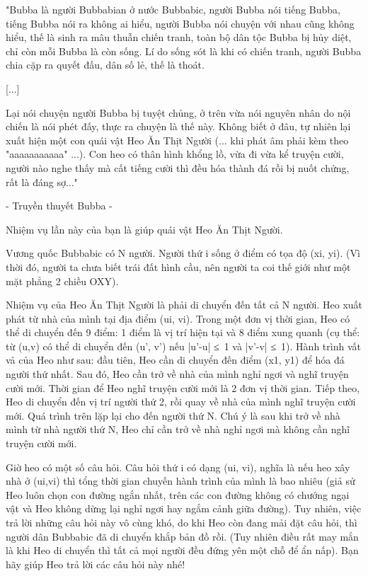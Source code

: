 



"Bubba là người Bubbabian ở nước Bubbabic, người Bubba nói tiếng Bubba, tiếng Bubba nói ra không ai hiểu, người Bubba nói chuyện với nhau cũng không hiểu, thế là sinh ra mâu thuẫn chiến tranh, toàn bộ dân tộc Bubba bị hủy diệt, chỉ còn mỗi Bubba là còn sống. Lí do sống sót là khi có chiến tranh, người Bubba chia cặp ra quyết đấu, dân số lẻ, thế là thoát.

[...]

    Lại nói chuyện người Bubba bị tuyệt chủng, ở trên vừa nói nguyên nhân do nội chiến là nói phét đấy, thực ra chuyện là thế này. Không biết ở đâu, tự nhiên lại xuất hiện một con quái vật Heo Ăn Thịt Người (... khi phát âm phải kèm theo "aaaaaaaaaaa" ...). Con heo có thân hình khổng lồ, vừa đi vừa kể truyện cười, người nào nghe thấy mà cất tiếng cười thì đều hóa thành đá rồi bị nuốt chửng, rất là đáng sợ..."   

- Truyền thuyết Bubba -

   Nhiệm vụ lần này của bạn là giúp quái vật Heo Ăn Thịt Người.  

   Vương quốc Bubbabic có N người. Người thứ i sống ở điểm có tọa độ (xi, yi). (Vì thời đó, người ta chưa biết trái đất hình cầu, nên người ta coi thế giới như một mặt phẳng 2 chiều OXY).  

   Nhiệm vụ của Heo Ăn Thịt Người là phải di chuyển đến tất cả N người. Heo xuất phát từ nhà của mình tại địa điểm (ui, vi). Trong một đơn vị thời gian, Heo có thể di chuyển đến 9 điểm: 1 điểm là vị trí hiện tại và 8 điểm xung quanh (cụ thể: từ (u,v) có thể di chuyển đến (u', v') nếu |u'-u| ≤ 1 và |v'-v| ≤ 1). Hành trình vất vả của Heo như sau: đầu tiên, Heo cần di chuyển đến điểm (x1, y1) để hóa đá người thứ nhất. Sau đó, Heo cần trở về nhà của mình nghỉ ngơi và nghĩ truyện cười mới. Thời gian để Heo nghĩ truyện cười mới là 2 đơn vị thời gian. Tiếp theo, Heo di chuyển đến vị trí người thứ 2, rồi quay về nhà của mình nghĩ truyện cười mới. Quá trình trên lặp lại cho đến người thứ N. Chú ý là sau khi trở về nhà mình từ nhà người thứ N, Heo chỉ cần trở về nhà nghỉ ngơi mà không cần nghĩ truyện cười mới.  

   Giờ heo có một số câu hỏi. Câu hỏi thứ i có dạng (ui, vi), nghĩa là nếu heo xây nhà ở (ui,vi) thì tổng thời gian chuyến hành trình của mình là bao nhiêu (giả sử Heo luôn chọn con đường ngắn nhất, trên các con đường không có chướng ngại vật và Heo không dừng lại nghỉ ngơi hay ngắm cảnh giữa đường). Tuy nhiên, việc trả lời những câu hỏi này vô cùng khó, do khi Heo còn đang mải đặt câu hỏi, thì người dân Bubbabic đã di chuyển khắp bản đồ rồi. (Tuy nhiên điều rất may mắn là khi Heo di chuyển thì tất cả mọi người đều đứng yên một chỗ để ẩn nấp). Bạn hãy giúp Heo trả lời các câu hỏi này nhé!  

